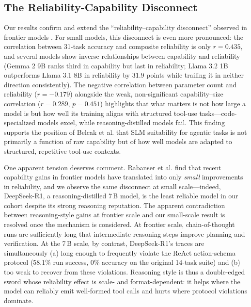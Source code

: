 \subsection{The Reliability-Capability Disconnect}

Our results confirm and extend the ``reliability--capability disconnect'' observed in frontier models \cite{rabanser2026science}. For small models, this disconnect is even more pronounced: the correlation between 31-task accuracy and composite reliability is only $r = 0.435$, and several models show inverse relationships between capability and reliability (Gemma 2 9B ranks third in capability but last in reliability; Llama 3.2 1B outperforms Llama 3.1 8B in reliability by 31.9 points while trailing it in neither direction consistently). The negative correlation between parameter count and reliability ($r = -0.179$) alongside the weak, non-significant capability--size correlation ($r = 0.289$, $p = 0.451$) highlights that what matters is not how large a model is but how well its training aligns with structured tool-use tasks---code-specialized models excel, while reasoning-distilled models fail. This finding supports the position of Belcak et al. \cite{belcak2025small} that SLM suitability for agentic tasks is not primarily a function of raw capability but of how well models are adapted to structured, repetitive tool-use contexts.

One apparent tension deserves comment. Rabanser et al. \cite{rabanser2026science} find that recent capability gains in frontier models have translated into only \emph{small} improvements in reliability, and we observe the same disconnect at small scale---indeed, DeepSeek-R1, a reasoning-distilled 7\,B model, is the least reliable model in our cohort despite its strong reasoning reputation. The apparent contradiction between reasoning-style gains at frontier scale and our small-scale result is resolved once the mechanism is considered. At frontier scale, chain-of-thought runs are sufficiently long that intermediate reasoning steps improve planning and verification. At the 7\,B scale, by contrast, DeepSeek-R1's traces are simultaneously (a) long enough to frequently violate the ReAct action-schema protocol (58.1\% run success, 0\% accuracy on the original 14-task suite) and (b) too weak to recover from these violations. Reasoning style is thus a double-edged sword whose reliability effect is scale- and format-dependent: it helps where the model can reliably emit well-formed tool calls and hurts where protocol violations dominate.

